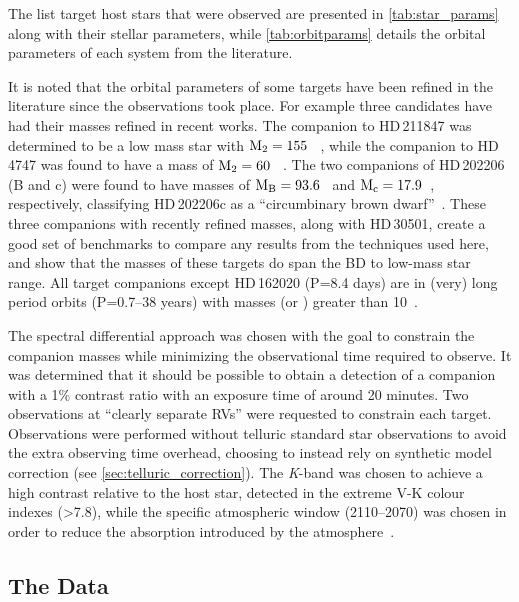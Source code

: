 The list target host stars that were observed are presented in \cref{tab:star_params} along with their stellar parameters, while \cref{tab:orbitparams} details the orbital parameters of each system from the literature.

It is noted that the orbital parameters of some targets have been refined in the literature since the observations took place.
For example three candidates have had their masses refined in recent works.
The companion to {HD\,211847} was determined to be a low mass star with \(\rm M_2=155~\)\Mjup{}~\citep{moutou_eccentricity_2017}, while the companion to {HD\,4747} was found to have a mass of \(\rm M_2=60~\)\Mjup{}~\citep{crepp_trends_2016}.
The two companions of {HD\,202206} (B and c) were found to have masses of \(\rm M_B =93.6\)~\Mjup{} and \(\rm M_c = 17.9\)~\Mjup{}, respectively, classifying {HD\,202206}c as a ``circumbinary brown dwarf''~\citep{benedict_hd_2017}.
These three companions with recently refined masses, along with {HD\,30501}, create a good set of benchmarks to compare any results from the techniques used here, and show that the masses of these targets do span the {BD} to low-mass star range.
All target companions except {HD\,162020} (P=8.4 days) are in (very) long period orbits (P=0.7--38 years) with masses (or \Mtwosini{}) greater than 10~\Mjup{}.

\begin{landscape}
    
    
\end{landscape}

The spectral differential approach was chosen with the goal to constrain the companion masses while minimizing the observational time required to observe.
It was determined that it should be possible to obtain a detection of a companion with a 1\% contrast ratio with an exposure time of around 20 minutes.
Two observations at ``clearly separate {RV}s'' were requested to constrain each target.
Observations were performed without telluric standard star observations to avoid the extra observing time overhead, choosing to instead rely on synthetic model correction (see \cref{sec:telluric_correction}).
The \textit{K}-band was chosen to achieve a high contrast relative to the host star, detected in the extreme V-K colour indexes (>7.8), while the specific atmospheric window (2110--2070\nm{}) was chosen in order to reduce the absorption introduced by the atmosphere~\citep{barnes_hd_2008}.


\subsection{The Data}

